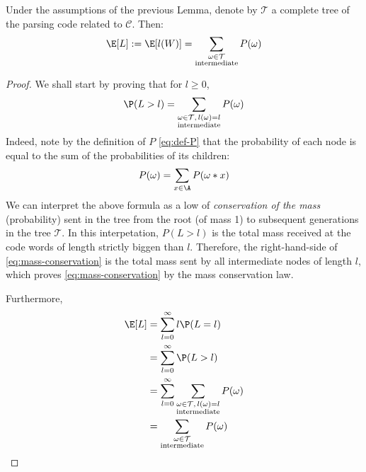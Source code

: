 \documentclass[toc, titlepaged]{../cs-classes/cs-classes}
\begin{document}
\begin{lemma}
    Under the assumptions of the previous Lemma, denote by $\mathcal{T}$ a complete tree of the parsing code related to $\mathcal{C}$. Then:
    \begin{equation}
        \E[L] := \E[l(W)] = \sum_{\substack{\omega\in\mathcal{T}\\\textnormal{intermediate}}}P(\omega)
    \end{equation}
\end{lemma}
\begin{proof}
    We shall start by proving that for $l\geq0$,
    \begin{equation*}
        \label{eq:mass-conservation}
        \P(L>l) = \sum_{\substack{\omega\in\mathcal{T}, \,l(\omega)=l\\\textnormal{intermediate}}}P(\omega)
    \end{equation*}
    Indeed, note by the definition of $P$ \eqref{eq:def-P} that the probability of each node is equal to the sum of the probabilities of its children:
    \begin{equation*}
        P(\omega) = \sum_{x\in\A}P(\omega*x)
    \end{equation*}
    We can interpret the above formula as a low of \emph{conservation of the mass} (probability) sent in the tree from the root (of mass 1) to subsequent generations in the tree $\mathcal{T}$. In this interpetation, $P(L>l)$ is the total mass received at the code words of length strictly biggen than $l$. Therefore, the right-hand-side of \eqref{eq:mass-conservation} is the total mass sent by all intermediate nodes of length $l$, which proves \eqref{eq:mass-conservation} by the mass conservation law.

    Furthermore,
    \begin{equation*}
        \begin{aligned}
            \E[L] &= \sum_{l=0}^\infty l\P(L=l)\\
            &= \sum_{l=0}^\infty \P(L>l)\\
            &= \sum_{l=0}^\infty \sum_{\substack{\omega\in\mathcal{T}, \,l(\omega)=l\\\textnormal{intermediate}}}P(\omega)\\
            &= \sum_{\substack{\omega\in\mathcal{T}\\\textnormal{intermediate}}}P(\omega)
        \end{aligned}
    \end{equation*}
\end{proof}
\end{document}
